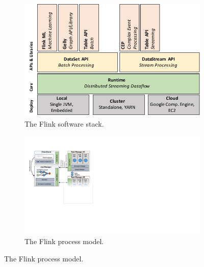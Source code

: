 \documentclass[11pt]{article}
\begin{document}
\begin{figure}[t!]
\begin{minipage}{1.1\linewidth}
      \centering
      \hspace{-0.1\linewidth}
      \begin{minipage}{0.48\linewidth}
          \begin{figure}[H]
              \centering
			\includegraphics[width=.88\textwidth,natheight=590,natwidth=500]{figs/stack.pdf}
			\vspace{-3mm}
			\caption{The Flink software stack.}
			\vspace{-3mm}
			\label{fig:stack}
          \end{figure}
      \end{minipage}
      \begin{minipage}{0.5\linewidth}
          \begin{figure}[H]
				\includegraphics[width=.95\textwidth,natheight=317,natwidth=204]{figs/architecture.pdf}
    			\vspace{-2.5mm}
    			\caption{The Flink process model.}
    			\label{fig:process-model}
          \end{figure}
      \end{minipage}
  \end{minipage}
\end{figure}
\end{document}
